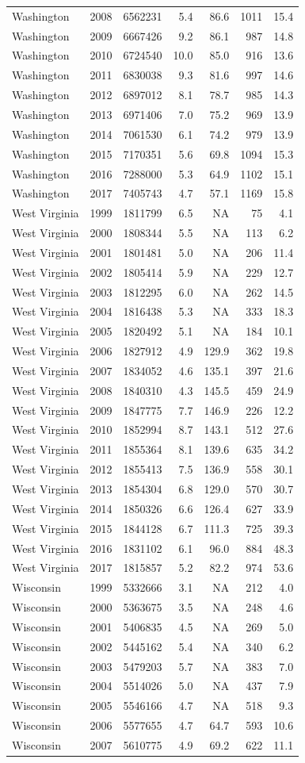 \documentclass[
]{article}
\begin{document}
\begin{longtable}[]{@{}lrrrrrr@{}}
Washington & 2008 & 6562231 & 5.4 & 86.6 & 1011 & 15.4\tabularnewline
Washington & 2009 & 6667426 & 9.2 & 86.1 & 987 & 14.8\tabularnewline
Washington & 2010 & 6724540 & 10.0 & 85.0 & 916 & 13.6\tabularnewline
Washington & 2011 & 6830038 & 9.3 & 81.6 & 997 & 14.6\tabularnewline
Washington & 2012 & 6897012 & 8.1 & 78.7 & 985 & 14.3\tabularnewline
Washington & 2013 & 6971406 & 7.0 & 75.2 & 969 & 13.9\tabularnewline
Washington & 2014 & 7061530 & 6.1 & 74.2 & 979 & 13.9\tabularnewline
Washington & 2015 & 7170351 & 5.6 & 69.8 & 1094 & 15.3\tabularnewline
Washington & 2016 & 7288000 & 5.3 & 64.9 & 1102 & 15.1\tabularnewline
Washington & 2017 & 7405743 & 4.7 & 57.1 & 1169 & 15.8\tabularnewline
West Virginia & 1999 & 1811799 & 6.5 & NA & 75 & 4.1\tabularnewline
West Virginia & 2000 & 1808344 & 5.5 & NA & 113 & 6.2\tabularnewline
West Virginia & 2001 & 1801481 & 5.0 & NA & 206 & 11.4\tabularnewline
West Virginia & 2002 & 1805414 & 5.9 & NA & 229 & 12.7\tabularnewline
West Virginia & 2003 & 1812295 & 6.0 & NA & 262 & 14.5\tabularnewline
West Virginia & 2004 & 1816438 & 5.3 & NA & 333 & 18.3\tabularnewline
West Virginia & 2005 & 1820492 & 5.1 & NA & 184 & 10.1\tabularnewline
West Virginia & 2006 & 1827912 & 4.9 & 129.9 & 362 & 19.8\tabularnewline
West Virginia & 2007 & 1834052 & 4.6 & 135.1 & 397 & 21.6\tabularnewline
West Virginia & 2008 & 1840310 & 4.3 & 145.5 & 459 & 24.9\tabularnewline
West Virginia & 2009 & 1847775 & 7.7 & 146.9 & 226 & 12.2\tabularnewline
West Virginia & 2010 & 1852994 & 8.7 & 143.1 & 512 & 27.6\tabularnewline
West Virginia & 2011 & 1855364 & 8.1 & 139.6 & 635 & 34.2\tabularnewline
West Virginia & 2012 & 1855413 & 7.5 & 136.9 & 558 & 30.1\tabularnewline
West Virginia & 2013 & 1854304 & 6.8 & 129.0 & 570 & 30.7\tabularnewline
West Virginia & 2014 & 1850326 & 6.6 & 126.4 & 627 & 33.9\tabularnewline
West Virginia & 2015 & 1844128 & 6.7 & 111.3 & 725 & 39.3\tabularnewline
West Virginia & 2016 & 1831102 & 6.1 & 96.0 & 884 & 48.3\tabularnewline
West Virginia & 2017 & 1815857 & 5.2 & 82.2 & 974 & 53.6\tabularnewline
Wisconsin & 1999 & 5332666 & 3.1 & NA & 212 & 4.0\tabularnewline
Wisconsin & 2000 & 5363675 & 3.5 & NA & 248 & 4.6\tabularnewline
Wisconsin & 2001 & 5406835 & 4.5 & NA & 269 & 5.0\tabularnewline
Wisconsin & 2002 & 5445162 & 5.4 & NA & 340 & 6.2\tabularnewline
Wisconsin & 2003 & 5479203 & 5.7 & NA & 383 & 7.0\tabularnewline
Wisconsin & 2004 & 5514026 & 5.0 & NA & 437 & 7.9\tabularnewline
Wisconsin & 2005 & 5546166 & 4.7 & NA & 518 & 9.3\tabularnewline
Wisconsin & 2006 & 5577655 & 4.7 & 64.7 & 593 & 10.6\tabularnewline
Wisconsin & 2007 & 5610775 & 4.9 & 69.2 & 622 & 11.1\tabularnewline

\end{longtable}
\end{document}
